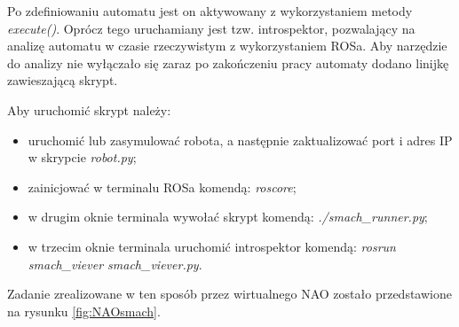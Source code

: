 

Po zdefiniowaniu automatu jest on aktywowany z wykorzystaniem metody \textit{execute()}. Oprócz tego uruchamiany jest tzw. introspektor, pozwalający na analizę automatu w czasie rzeczywistym z wykorzystaniem ROSa. Aby narzędzie do analizy nie wyłączało się zaraz po zakończeniu pracy automaty dodano linijkę zawieszającą skrypt.



Aby uruchomić skrypt należy:
\begin{itemize}
\setlength\itemsep{-0.5em}
    \item uruchomić lub zasymulować robota, a następnie zaktualizować port i adres IP w skrypcie \textit{robot.py};
    \item zainicjować w terminalu ROSa komendą: \textit{roscore};
    \item w drugim oknie terminala wywołać skrypt komendą: \textit{./smach\_runner.py};
    \item w trzecim oknie terminala uruchomić introspektor komendą: \textit{rosrun smach\_viever smach\_viever.py}.
\end{itemize}

Zadanie zrealizowane w ten sposób przez wirtualnego NAO zostało przedstawione na rysunku \ref{fig:NAOsmach}.

